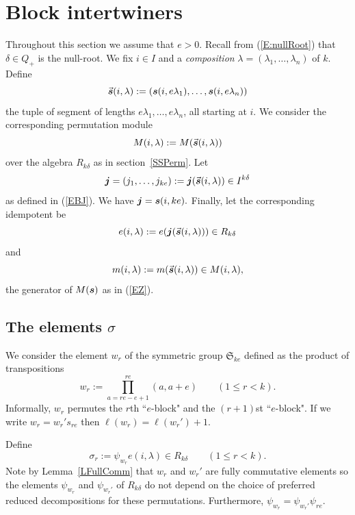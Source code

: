\documentclass[twoside,11pt,reqno]{amsart}
\numberwithin{equation}{section}
\theoremstyle{definition}  %
\def\bj{\text{\boldmath$j$}}
\def\bs{\text{\boldmath$s$}}
\newcommand{\0}{{\bar 0}}
\newcommand{\1}{{\bar 1}}
\newcommand{\la}{\lambda}
\def\Si{\mathfrak{S}}
\newcommand{\si}{\sigma}
\newcommand{\de}{\delta}
\begin{document}
\section{Block intertwiners}\label{SBI}
Throughout this section we assume that $e>0$. 
Recall from (\ref{E:nullRoot}) that $\de\in Q_+$ is the null-root.  
We fix $i\in I$ and a {\em composition} $\la=(\la_1,\dots,\la_n)$ of $k$. Define
$$\vec{\bs}(i,\la):=(\bs(i,e\la_1),\dots,\bs(i,e\la_n))$$ 
the tuple of segment of lengths $e\la_1,\dots,e\la_n$, all starting at $i$. We consider the corresponding permutation module 
$$M(i,\la):=M(\vec{\bs}(i,\la))$$ 
over the algebra $R_{k\de}$ as in section~\ref{SSPerm}. Let 
$$\bj=(j_1,\dots,j_{ke}):=\bj(\vec{\bs}(i,\la))\in I^{k\de}$$ 
as defined in (\ref{EBJ}). We have 
$\bj=\bs(i,ke). 
$
Finally, let the corresponding idempotent be 
$$
e(i,\la):=e(\bj(\vec{\bs}(i,\la)))\in R_{k\de}
$$ 
and 
$$m(i,\la):=m(\vec{\bs}(i,\la))\in M(i,\la),$$ 
the generator of $M(\bs)$ as in (\ref{EZ}). 



\subsection{\boldmath The elements $\si$}\label{SSSi}
We consider the element $w_r$ of the symmetric group $\Si_{ke}$ defined as the product of transpositions
\begin{equation}\label{w_r}
w_r:=\prod_{a=re-e+1}^{re}(a,a+e)\qquad(1\leq r<k).
\end{equation}
Informally, $w_r$ permutes the $r$th ``$e$-block" and the $(r+1)$st ``$e$-block". If we write $w_r=w_r's_{re}$ then $\ell(w_r)=\ell(w_r')+1$. 

Define
\begin{equation}\label{ESi_r}
\si_r:=\psi_{w_r}e(i,\la)\in R_{k\de}
\qquad(1\leq r<k).
\end{equation}
Note by Lemma~\ref{LFullComm} that $w_r$ and $w_r'$ are fully commutative elements so the elements 
$\psi_{w_r}$ and $\psi_{w_r'}$ of $R_{k\de}$ do not depend on the choice of preferred reduced decompositions for these
permutations. Furthermore, $\psi_{w_r}=\psi_{w_r'}\psi_{re}$. 
\end{document}

